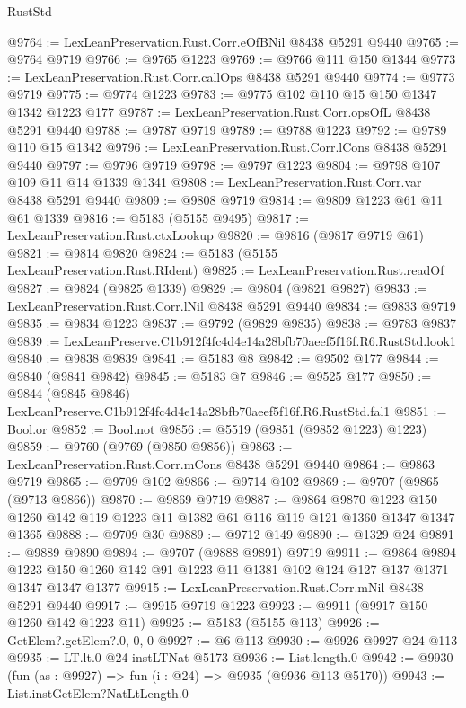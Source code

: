 \begin{lexlean}{RustStd}
\begin{coremodule}
@9764 := LexLeanPreservation.Rust.Corr.eOfBNil @8438 @5291 @9440
@9765 := @9764 @9719
@9766 := @9765 @1223
@9769 := @9766 @111 @150 @1344
@9773 := LexLeanPreservation.Rust.Corr.callOps @8438 @5291 @9440
@9774 := @9773 @9719
@9775 := @9774 @1223
@9783 := @9775 @102 @110 @15 @150 @1347 @1342 @1223 @177
@9787 := LexLeanPreservation.Rust.Corr.opsOfL @8438 @5291 @9440
@9788 := @9787 @9719
@9789 := @9788 @1223
@9792 := @9789 @110 @15 @1342
@9796 := LexLeanPreservation.Rust.Corr.lCons @8438 @5291 @9440
@9797 := @9796 @9719
@9798 := @9797 @1223
@9804 := @9798 @107 @109 @11 @14 @1339 @1341
@9808 := LexLeanPreservation.Rust.Corr.var @8438 @5291 @9440
@9809 := @9808 @9719
@9814 := @9809 @1223 @61 @11 @61 @1339
@9816 := @5183 (@5155 @9495)
@9817 := LexLeanPreservation.Rust.ctxLookup
@9820 := @9816 (@9817 @9719 @61)
@9821 := @9814 @9820
@9824 := @5183 (@5155 LexLeanPreservation.Rust.RIdent)
@9825 := LexLeanPreservation.Rust.readOf
@9827 := @9824 (@9825 @1339)
@9829 := @9804 (@9821 @9827)
@9833 := LexLeanPreservation.Rust.Corr.lNil @8438 @5291 @9440
@9834 := @9833 @9719
@9835 := @9834 @1223
@9837 := @9792 (@9829 @9835)
@9838 := @9783 @9837
@9839 := LexLeanPreserve.C1b912f4fc4d4e14a28bfb70aeef5f16f.R6.RustStd.look1
@9840 := @9838 @9839
@9841 := @5183 @8
@9842 := @9502 @177
@9844 := @9840 (@9841 @9842)
@9845 := @5183 @7
@9846 := @9525 @177
@9850 := @9844 (@9845 @9846) LexLeanPreserve.C1b912f4fc4d4e14a28bfb70aeef5f16f.R6.RustStd.fal1
@9851 := Bool.or
@9852 := Bool.not
@9856 := @5519 (@9851 (@9852 @1223) @1223)
@9859 := @9760 (@9769 (@9850 @9856))
@9863 := LexLeanPreservation.Rust.Corr.mCons @8438 @5291 @9440
@9864 := @9863 @9719
@9865 := @9709 @102
@9866 := @9714 @102
@9869 := @9707 (@9865 (@9713 @9866))
@9870 := @9869 @9719
@9887 := @9864
    @9870
    @1223
    @150
    @1260
    @142
    @119
    @1223
    @11
    @1382
    @61
    @116
    @119
    @121
    @1360
    @1347
    @1347
    @1365
@9888 := @9709 @30
@9889 := @9712 @149
@9890 := @1329 @24
@9891 := @9889 @9890
@9894 := @9707 (@9888 @9891) @9719
@9911 := @9864
    @9894
    @1223
    @150
    @1260
    @142
    @91
    @1223
    @11
    @1381
    @102
    @124
    @127
    @137
    @1371
    @1347
    @1347
    @1377
@9915 := LexLeanPreservation.Rust.Corr.mNil @8438 @5291 @9440
@9917 := @9915 @9719 @1223
@9923 := @9911 (@9917 @150 @1260 @142 @1223 @11)
@9925 := @5183 (@5155 @113)
@9926 := GetElem?.getElem?.{0, 0, 0}
@9927 := @6 @113
@9930 := @9926 @9927 @24 @113
@9935 := LT.lt.{0} @24 instLTNat @5173
@9936 := List.length.{0}
@9942 := @9930 (fun (as : @9927) => fun (i : @24) => @9935 (@9936 @113 @5170))
@9943 := List.instGetElem?NatLtLength.{0}

\end{coremodule}
\end{lexlean}
